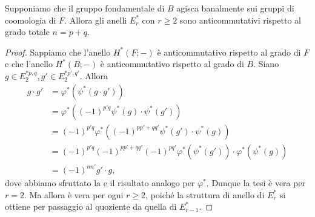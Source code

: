 \begin{corollary}
Supponiamo che il gruppo fondamentale di \(B\) agisca banalmente sui gruppi di coomologia di \(F\). Allora gli anelli \(E^\ast_r\) con \(r\ge 2\) sono anticommutativi rispetto al grado totale \(n=p+q\).
\end{corollary}
\begin{proof}
Sappiamo che l'anello \(H^*(F;-)\) è anticommutativo rispetto al grado di \(F\) e che l'anello \(H^*(B;-)\) è anticommutativo rispetto al grado di \(B\). Siano \(g\in E^{\ast p,q}_2,g'\in E^{\ast p',q'}_2\). Allora
\begin{align*}
g\cdot g'&=\varphi^*(\psi^*(g\cdot g'))\\
&=\varphi^*((-1)^{p'q}\psi^*(g)\cdot\psi^*(g'))\\
&=(-1)^{p'q}\varphi^*((-1)^{pp'+qq'}\psi^*(g')\cdot\psi^*(g))\\
&=(-1)^{p'q}(-1)^{pp'+qq'}(-1)^{pq'}\varphi^*(\psi^*(g'))\cdot\varphi^*(\psi^*(g))\\
&=(-1)^{nn'}g'\cdot g,
\end{align*}
dove abbiamo sfruttato la  e il risultato analogo per \(\varphi^*\). Dunque la tesi è vera per \(r=2\). Ma allora è vera per ogni \(r\ge 2\), poiché la struttura di anello di \(E^\ast_r\) si ottiene per passaggio al quoziente da quella di \(E^\ast_{r-1}\).
\end{proof}

